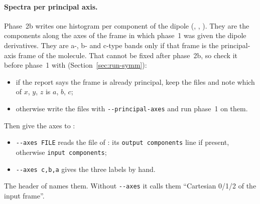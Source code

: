 \paragraph{Spectra per principal axis.} Phase~2b writes one histogram per
component of the dipole (, , ).
They are the components along the axes of the frame in which phase~1 was
given the dipole derivatives. They are a-, b- and c-type bands only if
that frame is the principal-axis frame of the molecule. That cannot be
fixed after phase~2b, so check it before phase~1 with
 (Section~\ref{sec:run-symm}):
\begin{itemize}
\item if the report says the frame is already principal, keep the files
  and note which of $x$, $y$, $z$ is $a$, $b$, $c$;
\item otherwise write the files with \texttt{-{}-principal-axes} and run
  phase~1 on them.
\end{itemize}
Then give the axes to :
\begin{itemize}
\item \texttt{-{}-axes FILE} reads the  file of
  : its \texttt{output components} line if present,
  otherwise \texttt{input components};
\item \texttt{-{}-axes c,b,a} gives the three labels by hand.
\end{itemize}
The header of  names them. Without
\texttt{-{}-axes} it calls them ``Cartesian 0/1/2 of the input frame''.

